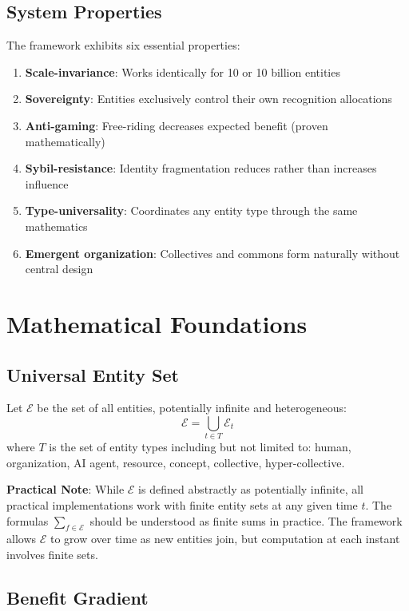 \documentclass[11pt,a4paper]{article}
\theoremstyle{definition}
\theoremstyle{remark}
\newcommand{\E}{\mathcal{E}}
\begin{document}
\subsection{System Properties}

The framework exhibits six essential properties:

\begin{enumerate}
\item \textbf{Scale-invariance}: Works identically for 10 or 10 billion entities
\item \textbf{Sovereignty}: Entities exclusively control their own recognition allocations
\item \textbf{Anti-gaming}: Free-riding decreases expected benefit (proven mathematically)
\item \textbf{Sybil-resistance}: Identity fragmentation reduces rather than increases influence
\item \textbf{Type-universality}: Coordinates any entity type through the same mathematics
\item \textbf{Emergent organization}: Collectives and commons form naturally without central design
\end{enumerate}

\section{Mathematical Foundations}

\subsection{Universal Entity Set}

Let $\E$ be the set of all entities, potentially infinite and heterogeneous:
\[ \E = \bigcup_{t \in T} \E_t \]
where $T$ is the set of entity types including but not limited to: human, organization, AI agent, resource, concept, collective, hyper-collective.


\textbf{Practical Note}: While $\E$ is defined abstractly as potentially infinite, all practical implementations work with finite entity sets at any given time $t$. The formulas $\sum_{f \in \E}$ should be understood as finite sums in practice. The framework allows $\E$ to grow over time as new entities join, but computation at each instant involves finite sets.

\subsection{Benefit Gradient}
\end{document}
